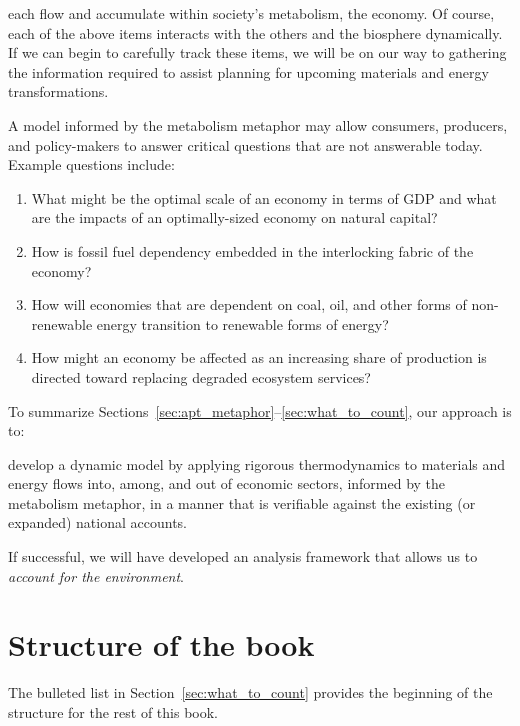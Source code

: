 \noindent{}each flow and accumulate within society's metabolism, the economy.
Of course, each of the above items interacts with the others 
and the biosphere dynamically.
If we can begin to carefully track these items, 
we will be on our way to gathering the information required to 
assist planning for upcoming materials and energy transformations.

A model informed by the metabolism metaphor may allow consumers, producers,
and policy-makers to answer critical questions that are not
answerable today. Example questions include:

\begin{enumerate}
	\item{What might be the optimal scale of an economy in terms of GDP 
			and what are the impacts of an optimally-sized economy on natural capital?}
    \item{How is fossil fuel dependency embedded in the interlocking fabric of the economy?} 
    \item{How will economies that are dependent on coal, oil, 
 			and other forms of non-renewable energy transition 
			to renewable forms of energy?}
	\item{How might an economy be affected as an increasing share of production
			is directed toward replacing 
			degraded ecosystem services?~\cite[p.~221]{kummel2011}​}
\end{enumerate}

To summarize Sections~\ref{sec:apt_metaphor}--\ref{sec:what_to_count}, 
our approach is to:

\begin{svgraybox}
	develop a dynamic model 
	by applying rigorous thermodynamics 
	to materials and energy flows into, among, 
	and out of economic sectors,
	informed by the metabolism metaphor,
	in a manner that is verifiable against 
	the existing (or expanded) 
	national accounts.
\end{svgraybox}

\noindent{}If successful, we will have developed an analysis framework 
that allows us to \emph{account for the environment}.


\section{Structure of the book}
\label{sec:structure}

The bulleted list in Section~\ref{sec:what_to_count} 
provides the beginning of the structure for the rest of this book.

